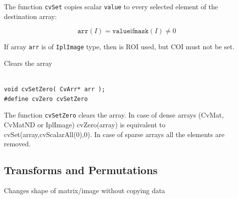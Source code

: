 \begin{description}
\end{description}


The function \texttt{cvSet} copies scalar \texttt{value} to every selected element of the destination array:

\[
\texttt{arr}(I)=\texttt{value} \text{if} \texttt{mask}(I) \ne 0
\]

If array \texttt{arr} is of \texttt{IplImage} type, then is ROI used, but COI must not be set.

\label{SetZero}

Clears the array

\begin{lstlisting}

void cvSetZero( CvArr* arr );
#define cvZero cvSetZero

\end{lstlisting}

\begin{description}
\end{description}

The function \texttt{cvSetZero} clears the array. In case of dense arrays (CvMat, CvMatND or IplImage) cvZero(array) is equivalent to
cvSet(array,cvScalarAll(0),0).
In case of sparse arrays all the elements are removed.

\subsection{Transforms and Permutations}

\label{Reshape}

Changes shape of matrix/image without copying data


\begin{description}
\end{description}

